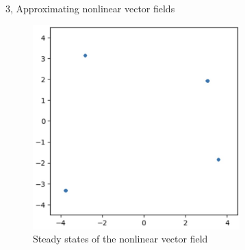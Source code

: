 \documentclass[10pt,a4paper]{article}
\begin{document}
\begin{task}{3, Approximating nonlinear vector fields}
\begin{figure}[H]
    \centering
    \includegraphics[width=8cm]{images/steady_states.jpg}
    \caption{Steady states of the nonlinear vector field}
    \label{steady_states}
\end{figure}

\end{task}

\newpage
\end{document}
